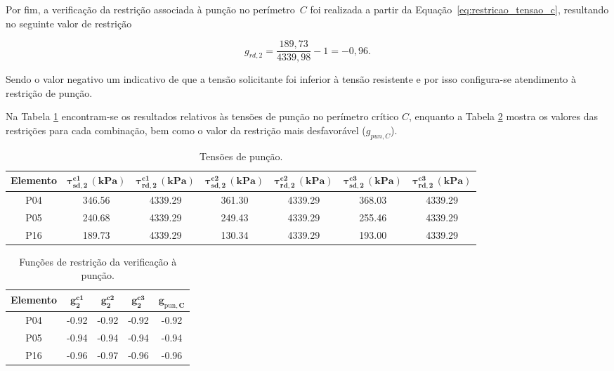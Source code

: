 Por fim, a verificação da restrição associada à punção no perímetro~$C$ foi realizada a partir da Equação~\eqref{eq:restricao_tensao_c}, resultando no seguinte valor de restrição

\begin{equation}
g_{rd,2} = \frac{189,73}{4339,98}-1 = -0,96.
    \label{eq:EL16_restricao_tensao_c}
\end{equation}

Sendo o valor negativo um indicativo de que a tensão solicitante foi inferior à tensão resistente e por isso configura-se atendimento à restrição de punção.

Na Tabela \ref{tab:punção_tensoes_s16} encontram-se os resultados relativos às tensões de punção no perímetro crítico $C$, enquanto a Tabela \ref{tab:puncao_g_s16} mostra os valores das restrições para cada combinação, bem como o valor da restrição mais desfavorável ($g_{pun,C}$).

\begin{table}[H]
\caption{Tensões de punção.}
\label{tab:punção_tensoes_s16}
\centering
\begin{tabular}{ccccccc}
\toprule
\textbf{Elemento} &
$\mathbf{\tau_{sd,2}^{c1}\,(kPa)}$ & $\mathbf{\tau_{rd,2}^{c1}\,(kPa)}$ &
$\mathbf{\tau_{sd,2}^{c2}\,(kPa)}$ & $\mathbf{\tau_{rd,2}^{c2}\,(kPa)}$ &
$\mathbf{\tau_{sd,2}^{c3}\,(kPa)}$ & $\mathbf{\tau_{rd,2}^{c3}\,(kPa)}$ \\
\midrule
P04 & 346.56 & 4339.29 & 361.30 & 4339.29 & 368.03 & 4339.29 \\
P05 & 240.68 & 4339.29 & 249.43 & 4339.29 & 255.46 & 4339.29 \\
P16 & 189.73 & 4339.29 & 130.34 & 4339.29 & 193.00 & 4339.29 \\
\bottomrule
\end{tabular}
\end{table}

\begin{table}[htpb]
\caption{Funções de restrição da verificação à punção.}
\label{tab:puncao_g_s16}
\centering
\begin{tabular}{ccccc}
\toprule
\textbf{Elemento} &
$\mathbf{g_{2}^{c1}}$ & $\mathbf{g_{2}^{c2}}$ & $\mathbf{g_{2}^{c3}}$ & $\mathbf{g_{\mathrm{pun},C}}$ \\
\midrule
P04 & -0.92 & -0.92 & -0.92 & -0.92 \\
P05 & -0.94 & -0.94 & -0.94 & -0.94 \\
P16 & -0.96 & -0.97 & -0.96 & -0.96 \\
\bottomrule
\end{tabular}
\end{table}


